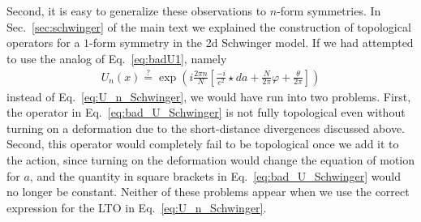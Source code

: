 \documentclass[11pt]{article}
\begin{document}
Second, it is easy to generalize these observations to $n$-form symmetries.   In Sec.~\ref{sec:schwinger} of the main text we explained the construction of topological operators for a $1$-form symmetry in the 2d Schwinger model.  If we had attempted to use the analog of Eq.~\eqref{eq:badU1}, namely
\begin{align}
    U_n(x) \stackrel{?}{=} \exp{\left( i\frac{2\pi n}{N} \left[\frac{-i}{e^2} \star da + \frac{N}{2\pi} \varphi +\frac{\theta}{2\pi}\right] \right)} 
    \label{eq:bad_U_Schwinger}
\end{align}
instead of Eq.~\eqref{eq:U_n_Schwinger}, we would have run into two problems.  First, the operator in Eq.~\eqref{eq:bad_U_Schwinger} is not fully topological even without turning on a deformation due to the short-distance divergences discussed above.  Second, this operator would completely fail to be topological once we add it to the action, since turning on the deformation would change the equation of motion for $a$, and the quantity in square brackets in Eq.~\eqref{eq:bad_U_Schwinger} would no longer be constant.  Neither of these problems appear when we use the correct expression for the LTO in Eq.~\eqref{eq:U_n_Schwinger}.
\end{document}
